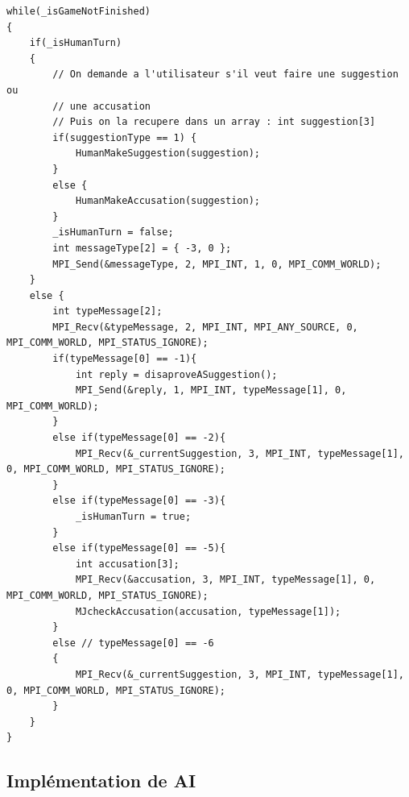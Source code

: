 \documentclass[a4paper,10pt]{article}
\begin{document}
		\begin{lstlisting}
while(_isGameNotFinished)
{
	if(_isHumanTurn)
	{
		// On demande a l'utilisateur s'il veut faire une suggestion ou 
		// une accusation
		// Puis on la recupere dans un array : int suggestion[3]
		if(suggestionType == 1) {
			HumanMakeSuggestion(suggestion);
		}
		else {
			HumanMakeAccusation(suggestion);
		}
		_isHumanTurn = false;
		int messageType[2] = { -3, 0 };
		MPI_Send(&messageType, 2, MPI_INT, 1, 0, MPI_COMM_WORLD);
	} 
	else {
		int typeMessage[2];
		MPI_Recv(&typeMessage, 2, MPI_INT, MPI_ANY_SOURCE, 0, MPI_COMM_WORLD, MPI_STATUS_IGNORE);
		if(typeMessage[0] == -1){
			int reply = disaproveASuggestion();
			MPI_Send(&reply, 1, MPI_INT, typeMessage[1], 0, MPI_COMM_WORLD);
		}
		else if(typeMessage[0] == -2){
			MPI_Recv(&_currentSuggestion, 3, MPI_INT, typeMessage[1], 0, MPI_COMM_WORLD, MPI_STATUS_IGNORE);		
		}
		else if(typeMessage[0] == -3){
			_isHumanTurn = true;
		}
		else if(typeMessage[0] == -5){
			int accusation[3];
			MPI_Recv(&accusation, 3, MPI_INT, typeMessage[1], 0, MPI_COMM_WORLD, MPI_STATUS_IGNORE);
			MJcheckAccusation(accusation, typeMessage[1]);
		}
		else // typeMessage[0] == -6
		{
			MPI_Recv(&_currentSuggestion, 3, MPI_INT, typeMessage[1], 0, MPI_COMM_WORLD, MPI_STATUS_IGNORE);
		}
	}	
}
\end{lstlisting}
\fontfamily{}	
	




	 
	 \subsection{Implémentation de AI} 	\hypertarget{AIimplementation}{}
	 
\end{document}
